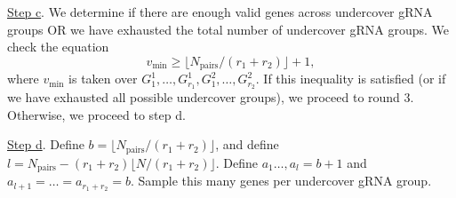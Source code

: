 \documentclass[12pt]{article}
\begin{document}
\underline{Step c}. We determine if there are enough valid genes across undercover gRNA groups OR we have exhausted the total number of undercover gRNA groups. We check the equation
$$ v_\textrm{min} \geq \lfloor N_\textrm{pairs}/(r_1 + r_2) \rfloor + 1,$$ where $v_\textrm{min}$ is taken over $G^1_1, \dots, G_{r_1}^1, G^2_1, \dots, G^2_{r_2}$. If this inequality is satisfied (or if we have exhausted all possible undercover groups), we proceed to round 3. Otherwise, we proceed to step d.

\underline{Step d}. Define $b = \lfloor N_\textrm{pairs}/(r_1 + r_2) \rfloor$, and define $l = N_\textrm{pairs} - (r_1 + r_2) \lfloor N / (r_1 + r_2) \rfloor$. Define $a_1 \dots, a_l = b+1$ and $a_{l+1} = \dots = a_{r_1 + r_2} = b$. Sample this many genes per undercover gRNA group. 
\end{document}
